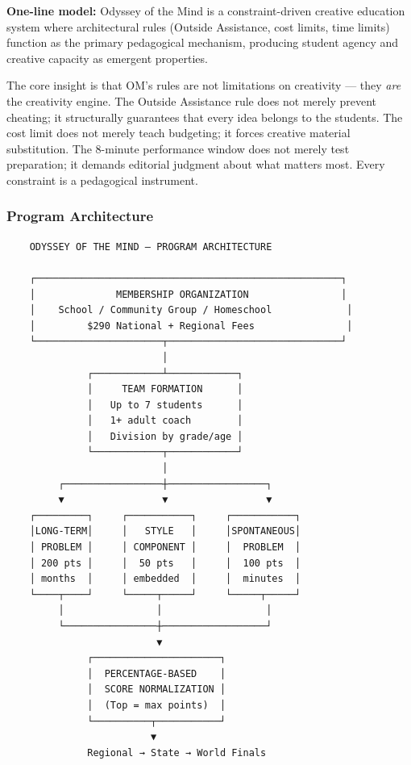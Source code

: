 \documentclass[11pt,letterpaper]{article}
\begin{document}
\begin{quotebox}
\textbf{One-line model:} Odyssey of the Mind is a constraint-driven creative education system where architectural rules (Outside Assistance, cost limits, time limits) function as the primary pedagogical mechanism, producing student agency and creative capacity as emergent properties.
\end{quotebox}

The core insight is that OM's rules are not limitations on creativity --- they \emph{are} the creativity engine. The Outside Assistance rule does not merely prevent cheating; it structurally guarantees that every idea belongs to the students. The cost limit does not merely teach budgeting; it forces creative material substitution. The 8-minute performance window does not merely test preparation; it demands editorial judgment about what matters most. Every constraint is a pedagogical instrument.

\subsubsection{Program Architecture}

\begin{asciibox}
\begin{verbatim}
    ODYSSEY OF THE MIND — PROGRAM ARCHITECTURE

    ┌─────────────────────────────────────────────────────┐
    │              MEMBERSHIP ORGANIZATION                │
    │    School / Community Group / Homeschool             │
    │         $290 National + Regional Fees                │
    └──────────────────────┬──────────────────────────────┘
                           │
              ┌────────────┴────────────┐
              │     TEAM FORMATION      │
              │   Up to 7 students      │
              │   1+ adult coach        │
              │   Division by grade/age │
              └────────────┬────────────┘
                           │
         ┌─────────────────┼─────────────────┐
         ▼                 ▼                 ▼
    ┌─────────┐     ┌───────────┐     ┌───────────┐
    │LONG-TERM│     │   STYLE   │     │SPONTANEOUS│
    │ PROBLEM │     │ COMPONENT │     │  PROBLEM  │
    │ 200 pts │     │  50 pts   │     │  100 pts  │
    │ months  │     │ embedded  │     │  minutes  │
    └────┬────┘     └─────┬─────┘     └─────┬─────┘
         │                │                  │
         └────────────────┼──────────────────┘
                          ▼
              ┌──────────────────────┐
              │  PERCENTAGE-BASED    │
              │  SCORE NORMALIZATION │
              │  (Top = max points)  │
              └──────────┬───────────┘
                         ▼
              Regional → State → World Finals
\end{verbatim}
\end{asciibox}
\end{document}
